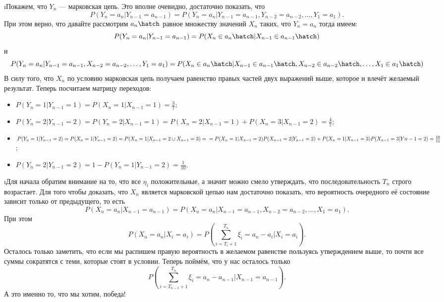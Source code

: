 \i Покажем, что $Y_n$ --- марковская цепь. Это вполне очевидно, достаточно показать, что 
    \[P(Y_n = a_n | Y_{n-1} = a_{n-1}) = P(Y_n = a_n | Y_{n-1} = a_{n-1}, Y_{n-2} = a_{n-2}, \ldots, Y_1 = a_1).\]
При этом верно, что давайте рассмотрим $a_n\hatch$ равное множеству значений $X_n$ таких, что $Y_n = a_n$ тогда имеем:
    \[P(Y_n = a_n | Y_{n-1} = a_{n-1}) = P(X_n \in a_n\hatch | X_{n-1} \in a_{n-1}\hatch)\]
и 
    \[P(Y_n = a_n | Y_{n-1} = a_{n-1}, X_{n-2} = a_{n-2}, \ldots, Y_1 = a_1) = P(X_n \in a_n\hatch | X_{n-1} \in a_{n-1}\hatch, X_{n-2} \in a_{n-2}\hatch, \ldots, X_1 \in a_1\hatch)\]
В силу того, что $X_n$ по условию марковская цепь получаем равенство правых частей двух выражений выше, которое и влечёт желаемый результат.
Теперь посчитаем матрицу переходов:
\begin{itemize}
    \item $P(Y_n = 1 | Y_{n-1} = 1) = P(X_n = 1 | X_{n-1} = 1) = \frac{3}{7}$;
    \item $P(Y_n = 2 | Y_{n-1} = 2) = P(Y_n = 2 | X_{n-1} = 1) = P(X_n = 2 | X_{n-1} = 1) + P(X_n = 3 | X_{n-1} = 2) = \frac{4}{7}$;
    \item $P(Y_n = 1 | Y_{n-1} = 2) = P(X_n = 1 | Y_{n-1} = 2) = P(X_n = 1 | X_{n-1} = 2 \cup X_{n-1} = 3) = \\ =
        P(X_n = 1 | X_{n-1} = 2)P(X_{n-1} = 2 | Y_{n-1} = 2) + P(X_n = 1 | X_{n-1} = 3)P(X_{n-1} = 3| Y{n-1} = 2) = \frac{10}{11}$;
    \item $P(Y_n = 2 | Y_{n-1} = 2) = 1 - P(Y_n = 1 | Y_{n-1} = 2) = \frac{1}{10}$.
\end{itemize}


\i Для начала обратим внимание на то, что все $\eta_i$ положительные, а значит можно смело утверждать, что последовательность $T_n$ строго возрастает. Для того чтобы доказать, что 
$X_n$ является марковской цепью нам достаточно показать, что вероятность очередного её состояние зависит только от предыдущего, то есть 
    \[P(X_n = a_n | X_{n-1} = a_{n-1}) = P(X_n = a_n | X_{n-1} = a_{n-1}, X_{n-2} = a_{n-2}, \ldots, X_1 = a_1).\]
При этом
    \[P(X_n = a_n | X_i = a_i) = P(\sum_{i=T_i+1}^{T_n} \xi_i = a_n - a_i | X_i = a_i).\]
Осталось только заметить, что если мы распишем правую вероятность в желаемом равенстве пользуясь утверждением выше, то почти все суммы сократятся с теми, которые стоят в условии.
Теперь поймём, что у нас осталось только 
    \[P(\sum_{i=T_{n-1}+1}^{T_n} \xi_i = a_n - a_{n-1} | X_{n-1} = a_{n-1}).\]
А это именно то, что мы хотим, победа!
